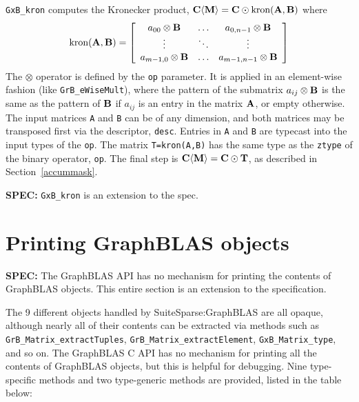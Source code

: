 \documentclass[12pt]{article}
\begin{document}
\verb'GxB_kron' computes the Kronecker product,
${\bf C \langle M \rangle = C \odot \mbox{kron}(A,B)}$ where
\[
\mbox{kron}{\bf (A,B)} =
\left[
    \begin{array}{ccc}
    a_{00} \otimes {\bf B} & \ldots & a_{0,n-1} \otimes {\bf B} \\
    \vdots & \ddots & \vdots \\
    a_{m-1,0} \otimes {\bf B} & \ldots & a_{m-1,n-1} \otimes {\bf B} \\
    \end{array}
\right]
\]
The $\otimes$ operator is defined by the \verb'op' parameter.  It is applied in
an element-wise fashion (like \verb'GrB_eWiseMult'), where the pattern of the
submatrix $a_{ij} \otimes {\bf B}$ is the same as the pattern of ${\bf B}$ if
$a_{ij}$ is an entry in the matrix ${\bf A}$, or empty otherwise.  The input
matrices \verb'A' and \verb'B' can be of any dimension, and both matrices may
be transposed first via the descriptor, \verb'desc'.  Entries in \verb'A' and
\verb'B' are typecast into the input types of the \verb'op'.  The matrix
\verb'T=kron(A,B)' has the same type as the \verb'ztype' of the binary
operator, \verb'op'.  The final step is ${\bf C \langle M \rangle  = C \odot
T}$, as described in Section~\ref{accummask}.

\begin{spec}
{\bf SPEC:} \verb'GxB_kron' is an extension to the spec.
\end{spec}

\newpage
\section{Printing GraphBLAS objects} %
\label{fprint}

\begin{spec}
{\bf SPEC:} The GraphBLAS API has no mechanism for printing the contents of
GraphBLAS objects.  This entire section is an extension to the specification.
\end{spec}

The 9 different objects handled by SuiteSparse:GraphBLAS are all opaque,
although nearly all of their contents can be extracted via methods such as
\verb'GrB_Matrix_extractTuples', \verb'GrB_Matrix_extractElement',
\verb'GxB_Matrix_type', and so on.  The GraphBLAS C API has no mechanism for
printing all the contents of GraphBLAS objects, but this is helpful for
debugging.  Nine type-specific methods and two type-generic methods are
provided, listed in the table below:
\end{document}
